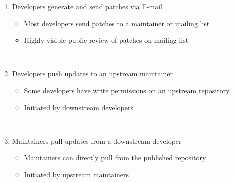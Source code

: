 \documentclass[draftclsnofoot,journal,onecolumn,12pt]{IEEEtran}
\begin{document}
\begin{enumerate}
  \item Developers generate and send patches via E-mail
    \begin{itemize}
      \item Most developers send patches to a maintainer or mailing list
      \item Highly visible public review of patches on mailing list
    \end{itemize}
\item Developers push updates to an upstream maintainer
    \begin{itemize}
      \item Some developers have write permissions on an upstream repository
      \item Initiated by downstream developers
    \end{itemize}
  \item Maintainers pull updates from a downstream developer
    \begin{itemize}
      \item Maintainers can directly pull from the published repository
      \item Initiated by upstream maintainers
    \end{itemize}
  \end{enumerate}
\end{document}
